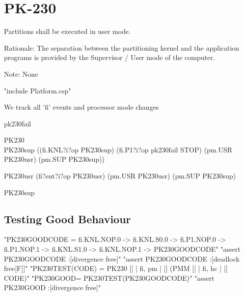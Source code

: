\section{PK-230} %

       Partitions shall be executed in user mode.

  Rationale: The separation between the partitioning kernel and the application
  programs is provided by the Supervisor / User mode of the computer.

  Note: None


\begin{assert} "include Platform.csp" \end{assert}

We track all 'fi' events and processor mode changes

\begin{circus}
\circchannel pk230fail

\circprocess PK230 \circdef \circbegin\\ %

PK230sup
 \circdef  ((fi.KNL?i?op \then PK230sup)
    \extchoice
    (fi.P1?i?op \then pk230fail \then STOP)
    \extchoice
    (pm.USR \then PK230usr)
    \extchoice
    (pm.SUP \then PK230sup))

PK230usr
 \circdef  (fi?ent?i?op \then PK230usr)
    \extchoice
    (pm.USR \then PK230usr)
    \extchoice
    (pm.SUP \then PK230sup)

  \circspot PK230sup\\
\circend
\end{circus}

\subsection{Testing Good Behaviour}

\begin{assert}
"PK230GOODCODE = fi.KNL.NOP.0 -> fi.KNL.S0.0  -> fi.P1.NOP.0  -> fi.P1.NOP.1  -> fi.KNL.S1.0  -> fi.KNL.NOP.1 -> PK230GOODCODE"
\also "assert PK230GOODCODE :[divergence free]"
\also "assert PK230GOODCODE :[deadlock free[F]]"
\also "PK230TEST(CODE) = PK230 [| {| fi, pm |} |] (PMM [| {| fi, hc |} |] CODE)"
\also "PK230GOOD= PK230TEST(PK230GOODCODE)"
\also "assert PK230GOOD :[divergence free]"
\end{assert}

